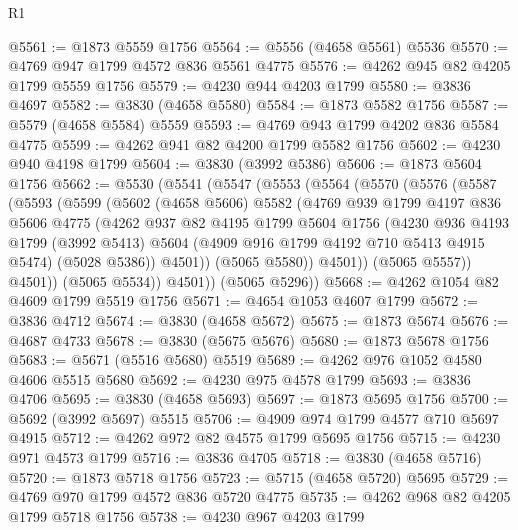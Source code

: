 \begin{lexlean}{R1}
\begin{coremodule}
@5561 := @1873 @5559 @1756
@5564 := @5556 (@4658 @5561) @5536
@5570 := @4769 @947 @1799 @4572 @836 @5561 @4775
@5576 := @4262 @945 @82 @4205 @1799 @5559 @1756
@5579 := @4230 @944 @4203 @1799
@5580 := @3836 @4697
@5582 := @3830 (@4658 @5580)
@5584 := @1873 @5582 @1756
@5587 := @5579 (@4658 @5584) @5559
@5593 := @4769 @943 @1799 @4202 @836 @5584 @4775
@5599 := @4262 @941 @82 @4200 @1799 @5582 @1756
@5602 := @4230 @940 @4198 @1799
@5604 := @3830 (@3992 @5386)
@5606 := @1873 @5604 @1756
@5662 := @5530
    (@5541
      (@5547
        (@5553
          (@5564
            (@5570
              (@5576
                (@5587
                  (@5593
                    (@5599
                      (@5602
                        (@4658 @5606)
                        @5582
                        (@4769
                          @939
                          @1799
                          @4197
                          @836
                          @5606
                          @4775
                          (@4262
                            @937
                            @82
                            @4195
                            @1799
                            @5604
                            @1756
                            (@4230
                              @936
                              @4193
                              @1799
                              (@3992 @5413)
                              @5604
                              (@4909 @916 @1799 @4192 @710 @5413 @4915 @5474)
                              (@5028 @5386))
                            @4501))
                        (@5065 @5580))
                      @4501))
                  (@5065 @5557))
                @4501))
            (@5065 @5534))
          @4501))
      (@5065 @5296))
@5668 := @4262 @1054 @82 @4609 @1799 @5519 @1756
@5671 := @4654 @1053 @4607 @1799
@5672 := @3836 @4712
@5674 := @3830 (@4658 @5672)
@5675 := @1873 @5674
@5676 := @4687 @4733
@5678 := @3830 (@5675 @5676)
@5680 := @1873 @5678 @1756
@5683 := @5671 (@5516 @5680) @5519
@5689 := @4262 @976 @1052 @4580 @4606 @5515 @5680
@5692 := @4230 @975 @4578 @1799
@5693 := @3836 @4706
@5695 := @3830 (@4658 @5693)
@5697 := @1873 @5695 @1756
@5700 := @5692 (@3992 @5697) @5515
@5706 := @4909 @974 @1799 @4577 @710 @5697 @4915
@5712 := @4262 @972 @82 @4575 @1799 @5695 @1756
@5715 := @4230 @971 @4573 @1799
@5716 := @3836 @4705
@5718 := @3830 (@4658 @5716)
@5720 := @1873 @5718 @1756
@5723 := @5715 (@4658 @5720) @5695
@5729 := @4769 @970 @1799 @4572 @836 @5720 @4775
@5735 := @4262 @968 @82 @4205 @1799 @5718 @1756
@5738 := @4230 @967 @4203 @1799

\end{coremodule}
\end{lexlean}
